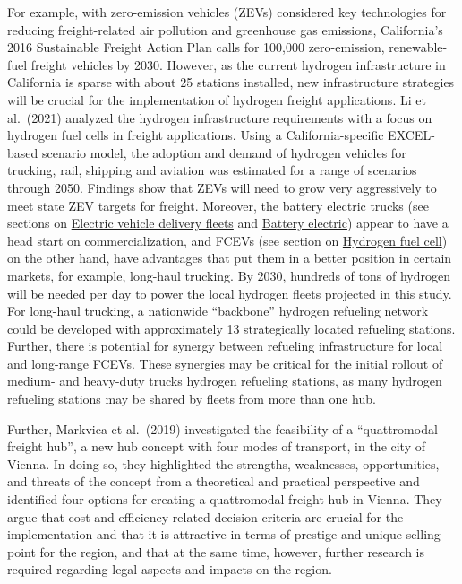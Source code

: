\documentclass[
]{book}
\begin{document}
For example, with zero-emission vehicles (ZEVs) considered key technologies for reducing freight-related air pollution and greenhouse gas emissions, California's 2016 Sustainable Freight Action Plan calls for 100,000 zero-emission, renewable-fuel freight vehicles by 2030. However, as the current hydrogen infrastructure in California is sparse with about 25 stations installed, new infrastructure strategies will be crucial for the implementation of hydrogen freight applications. Li et al.~(2021) analyzed the hydrogen infrastructure requirements with a focus on hydrogen fuel cells in freight applications. Using a California-specific EXCEL-based scenario model, the adoption and demand of hydrogen vehicles for trucking, rail, shipping and aviation was estimated for a range of scenarios through 2050. Findings show that ZEVs will need to grow very aggressively to meet state ZEV targets for freight. Moreover, the battery electric trucks (see sections on \protect\hyperlink{electric_delivery_fleets}{Electric vehicle delivery fleets} and \protect\hyperlink{bev}{Battery electric}) appear to have a head start on commercialization, and FCEVs (see section on \protect\hyperlink{FCEV}{Hydrogen fuel cell}) on the other hand, have advantages that put them in a better position in certain markets, for example, long-haul trucking. By 2030, hundreds of tons of hydrogen will be needed per day to power the local hydrogen fleets projected in this study. For long-haul trucking, a nationwide ``backbone'' hydrogen refueling network could be developed with approximately 13 strategically located refueling stations. Further, there is potential for synergy between refueling infrastructure for local and long-range FCEVs. These synergies may be critical for the initial rollout of medium- and heavy-duty trucks hydrogen refueling stations, as many hydrogen refueling stations may be shared by fleets from more than one hub.

Further, Markvica et al.~(2019) investigated the feasibility of a ``quattromodal freight hub'', a new hub concept with four modes of transport, in the city of Vienna. In doing so, they highlighted the strengths, weaknesses, opportunities, and threats of the concept from a theoretical and practical perspective and identified four options for creating a quattromodal freight hub in Vienna. They argue that cost and efficiency related decision criteria are crucial for the implementation and that it is attractive in terms of prestige and unique selling point for the region, and that at the same time, however, further research is required regarding legal aspects and impacts on the region.
\end{document}
